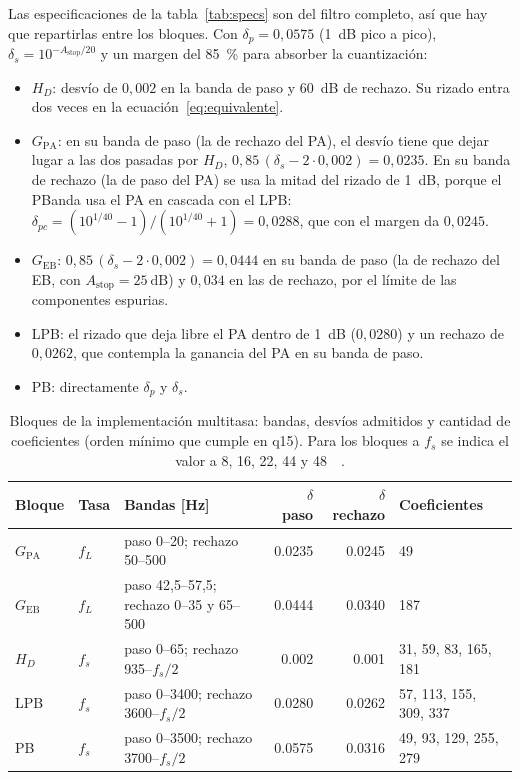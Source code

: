 \documentclass[11pt,a4paper]{article}
\begin{document}
Las especificaciones de la tabla~\ref{tab:specs} son del filtro completo, así
que hay que repartirlas entre los bloques. Con $\delta_p = 0{,}0575$
(\qty{1}{\deci\bel} pico a pico), $\delta_s = 10^{-A_{\text{stop}}/20}$ y un
margen del \qty{85}{\percent} para absorber la cuantización:
\begin{itemize}
  \item $H_D$: desvío de $0{,}002$ en la banda de paso y \qty{60}{\deci\bel}
        de rechazo. Su rizado entra dos veces en la
        ecuación~\eqref{eq:equivalente}.
  \item $G_{\text{PA}}$: en su banda de paso (la de rechazo del PA), el
        desvío tiene que dejar lugar a las dos pasadas por $H_D$,
        $0{,}85\,(\delta_s - 2 \cdot 0{,}002) = 0{,}0235$. En su banda de
        rechazo (la de paso del PA) se usa la mitad del rizado de
        \qty{1}{\deci\bel}, porque el PBanda usa el PA en cascada con el
        LPB: $\delta_{pc} = (10^{1/40}-1)/(10^{1/40}+1) = 0{,}0288$, que con
        el margen da $0{,}0245$.
  \item $G_{\text{EB}}$: $0{,}85\,(\delta_s - 2 \cdot 0{,}002) = 0{,}0444$
        en su banda de paso (la de rechazo del EB, con
        $A_{\text{stop}} = \qty{25}{\deci\bel}$) y $0{,}034$ en las de
        rechazo, por el límite de las componentes espurias.
  \item LPB: el rizado que deja libre el PA dentro de \qty{1}{\deci\bel}
        ($0{,}0280$) y un rechazo de $0{,}0262$, que contempla la ganancia
        del PA en su banda de paso.
  \item PB: directamente $\delta_p$ y $\delta_s$.
\end{itemize}

\begin{table}[H]
\centering
\caption{Bloques de la implementación multitasa: bandas, desvíos admitidos y
cantidad de coeficientes (orden mínimo que cumple en q15). Para los bloques
a $f_s$ se indica el valor a 8, 16, 22, 44 y \qty{48}{\kilo\sps}.}
\label{tab:bloques}
\footnotesize
\begin{tabular}{@{}l l p{4.4cm} r r p{2.6cm}@{}}
\toprule
\textbf{Bloque} & \textbf{Tasa} & \textbf{Bandas [Hz]} &
\textbf{$\delta$ paso} & \textbf{$\delta$ rechazo} & \textbf{Coeficientes}\\
\midrule
$G_{\text{PA}}$ & $f_L$ & paso 0--20; rechazo 50--500
                & \num{0.0235} & \num{0.0245} & 49\\
$G_{\text{EB}}$ & $f_L$ & paso 42,5--57,5; rechazo 0--35 y 65--500
                & \num{0.0444} & \num{0.0340} & 187\\
$H_D$           & $f_s$ & paso 0--65; rechazo 935--$f_s/2$
                & \num{0.002}  & \num{0.001}  & 31, 59, 83, 165, 181\\
LPB             & $f_s$ & paso 0--3400; rechazo 3600--$f_s/2$
                & \num{0.0280} & \num{0.0262} & 57, 113, 155, 309, 337\\
PB              & $f_s$ & paso 0--3500; rechazo 3700--$f_s/2$
                & \num{0.0575} & \num{0.0316} & 49, 93, 129, 255, 279\\
\bottomrule
\end{tabular}
\end{table}
\end{document}
